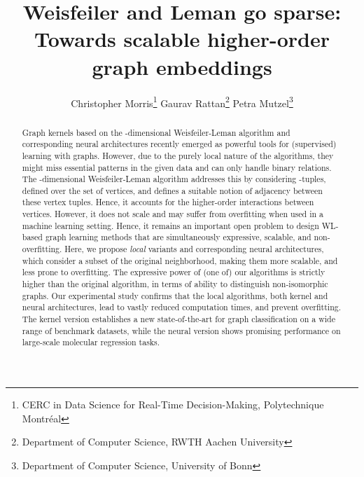 \documentclass{article}
\title{Weisfeiler and Leman go sparse: Towards scalable higher-order graph embeddings}
\author{Christopher Morris\thanks{CERC in Data Science for Real-Time Decision-Making, Polytechnique Montr{\'e}al} \And Gaurav Rattan\thanks{Department of Computer Science, RWTH Aachen University} \And Petra Mutzel\thanks{Department of Computer Science, University of Bonn}
}
\theoremstyle{definition}
\newcommand{\new}[1]{\emph{#1}}
\begin{document}
\maketitle

\begin{abstract}
Graph kernels based on the -dimensional Weisfeiler-Leman algorithm and corresponding neural architectures recently emerged as powerful tools for (supervised) learning with graphs. However, due to the purely local nature of the algorithms, they might miss essential patterns in the given data and can only handle binary relations. The -dimensional Weisfeiler-Leman algorithm addresses this by considering -tuples, defined over the set of vertices, and defines a suitable notion of adjacency between these vertex tuples. Hence, it accounts for the higher-order interactions between vertices. However, it does not scale and may suffer from overfitting when used in a machine learning setting. Hence, it remains an important open problem to design WL-based graph learning methods that are simultaneously expressive, scalable, and non-overfitting. Here, we propose \new{local} variants and corresponding neural architectures, which consider a subset of the original neighborhood, making them more scalable, and less prone to overfitting. The expressive power of (one of) our algorithms is strictly higher than the original algorithm, in terms of ability to distinguish non-isomorphic graphs. Our experimental study confirms that the local algorithms, both kernel and neural architectures, lead to vastly reduced computation times, and prevent overfitting. The kernel version establishes a new state-of-the-art for graph classification on a wide range of benchmark datasets, while the neural version shows promising performance on large-scale molecular regression tasks.
\end{abstract}
\end{document}
